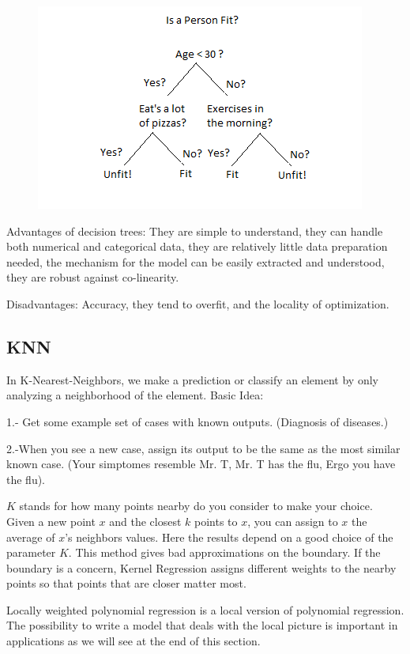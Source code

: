 \documentclass[11pt,letterpaper]{report}
\begin{document}
\begin{figure}[h!]
	\centering
	\includegraphics[width=0.45\linewidth]{figures/Decision-Trees.png}
	\caption{}
	\label{fig:Trees}
\end{figure} 	
Advantages of decision trees:
They are simple to understand, they can handle both numerical and categorical data, they are relatively little data preparation needed, the mechanism for the model can be easily extracted and understood, they are robust against co-linearity.

 Disadvantages: Accuracy, they tend to overfit, and the locality of optimization.
 
 
 \subsection{KNN}
 In K-Nearest-Neighbors, we make a prediction or classify an element by  only analyzing  a neighborhood of the element.  Basic Idea:
 
 1.- Get some example set of cases with known outputs. (Diagnosis of diseases.)
 
 2.-When you see a new case, assign its output to be the same as the most similar known case. (Your simptomes resemble Mr. T, Mr. T has the flu, Ergo you have the flu).

 $K$ stands for how many points nearby do you consider to make your choice. Given a new point $x$ and the closest $k$ points to $x$, you can assign to $x$ the average of $x$'s neighbors values. Here the results depend on a good choice of the parameter $K$. This method gives bad approximations on the boundary. If the boundary is a concern,  Kernel Regression assigns different weights to the nearby points so that points that are closer matter most. 
 
 Locally weighted polynomial  regression is a local version of polynomial regression.
 The possibility to write a model that deals with the local picture is important in applications as we will see at the end of this section.
 
\end{document}
